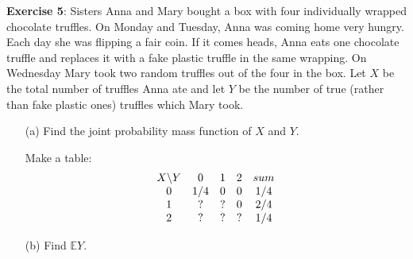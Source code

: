 \documentclass{article}
\begin{document}
\textbf{Exercise 5}: Sisters Anna and Mary bought a box with four individually wrapped chocolate truffles. On Monday and Tuesday, Anna was coming home very hungry. Each day she was flipping a fair coin. If it comes heads, Anna eats one chocolate truffle and replaces it with a fake plastic truffle in the same wrapping. On Wednesday Mary took two random truffles out of the four in the box. Let $X$ be the total number of truffles Anna ate and let $Y$ be the number of true (rather than fake plastic ones) truffles which Mary took.
    \begin{itemize}
        \item [(a)] Find the joint probability mass function of $X$ and $Y$.
            \begin{answer}
                Make a table:
                    \begin{align*}
                        \begin{array}{ c c c c c }
                            X \backslash Y & 0 & 1 & 2 & sum    \\
                            0              & 1/4 & 0 & 0 & 1/4 \\
                            1              & ? & ? & 0 & 2/4 \\
                            2              & ? & ? & ? & 1/4   
                        \end{array}
                    \end{align*}
                
            \end{answer}

        \item [(b)] Find $\mathbb{E}Y$.
    \end{itemize}
\end{document}
